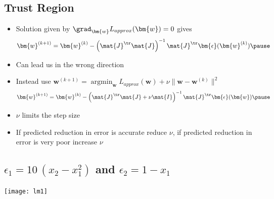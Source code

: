 \begin{slide}
\section[-1]{Trust Region}

\begin{PauseHighLight}
  \begin{itemize}
  \item Solution given by $\grad_{\bm{w}} L_{approx}(\bm{w}) = 0$ gives
    \begin{align*}
      \bm{w}^{(k+1)} = \bm{w}^{(k)} -
      \left(\mat{J}^\tr\mat{J}\right)^{-1} \mat{J}^\tr
      \bm{\epsilon}(\bm{w}^{(k)})\pause
    \end{align*}
  \item Can lead us in the wrong direction\pause
  \item Instead use $\bm{w}^{(k+1)}= \mathop{\mathrm{argmin}}_{\bm{w}} L_{approx}(\bm{w}) + \nu
    \|\bm{w}-\bm{w}^{(k)}\|^2$
    \begin{align*}
      \bm{w}^{(k+1)} = \bm{w}^{(k)} -
      \left(\mat{J}^\tr\mat{J} + \nu \mat{I}\right)^{-1} \mat{J}^\tr
      \bm{\epsilon}(\bm{w})\pause
    \end{align*}
  \item $\nu$ limits the step size\pause
  \item If predicted reduction in error is accurate reduce $\nu$, if
    predicted reduction in error is very poor increase $\nu$\pause
  \end{itemize}
\end{PauseHighLight}

\end{slide}


\begin{slide}
\section[-2]{$\epsilon_1 = 10\,(x_2-x_1^2)$ and $\epsilon_2=1-x_1$}
\pb\pause
\begin{center}
  \texttt{[image: lm1]}
\end{center}

\end{slide}



